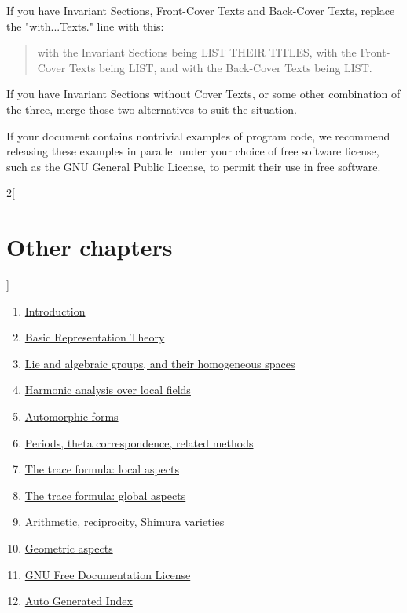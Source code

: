 \documentclass{stacks-project-book}
\theoremstyle{plain}
\theoremstyle{definition}
\theoremstyle{remark}
\numberwithin{equation}{subsection}
\begin{document}
If you have Invariant Sections, Front-Cover Texts and Back-Cover Texts,
replace the "with...Texts." line with this:

\bigskip
\begin{quote}
    with the Invariant Sections being LIST THEIR TITLES, with the
    Front-Cover Texts being LIST, and with the Back-Cover Texts being LIST.
\end{quote}
\bigskip

If you have Invariant Sections without Cover Texts, or some other
combination of the three, merge those two alternatives to suit the
situation.

If your document contains nontrivial examples of program code, we
recommend releasing these examples in parallel under your choice of
free software license, such as the GNU General Public License,
to permit their use in free software.

\begin{multicols}{2}[\section{Other chapters}]
\noindent
\begin{enumerate}
\item \hyperref[introduction-section-phantom]{Introduction}
\item \hyperref[representationtheory-section-phantom]{Basic Representation Theory}
\item \hyperref[algebraicgroups-section-phantom]{Lie and algebraic groups, and their homogeneous spaces}
\item \hyperref[harmonicanalysis-section-phantom]{Harmonic analysis over local fields}
\item \hyperref[automorphicforms-section-phantom]{Automorphic forms}
\item \hyperref[periods-section-phantom]{Periods, theta correspondence, related methods}
\item \hyperref[traceformulalocal-section-phantom]{The trace formula: local aspects}
\item \hyperref[traceformulaglobal-section-phantom]{The trace formula: global aspects}
\item \hyperref[arithmetic-section-phantom]{Arithmetic, reciprocity, Shimura varieties}
\item \hyperref[geometric-section-phantom]{Geometric aspects}
\item \hyperref[fdl-section-phantom]{GNU Free Documentation License}
\item \hyperref[index-section-phantom]{Auto Generated Index}
\end{enumerate}
\end{multicols}
\end{document}
